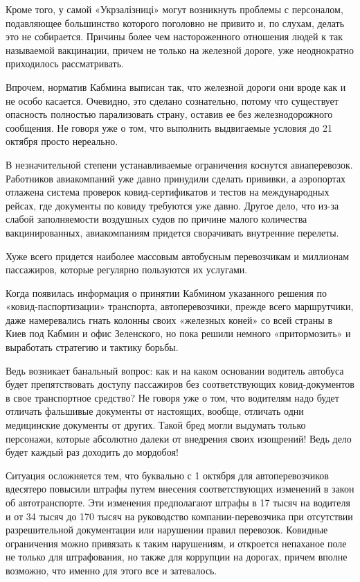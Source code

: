 Кроме того, у самой «Укрзалізниці» могут возникнуть проблемы с персоналом,
подавляющее большинство которого поголовно не привито и, по слухам, делать это
не собирается. Причины более чем настороженного отношения людей к так
называемой вакцинации, причем не только на железной дороге, уже неоднократно
приходилось рассматривать.

Впрочем, норматив Кабмина выписан так, что железной дороги они вроде как и не
особо касается. Очевидно, это сделано сознательно, потому что существует
опасность полностью парализовать страну, оставив ее без железнодорожного
сообщения. Не говоря уже о том, что выполнить выдвигаемые условия до 21 октября
просто нереально.

В незначительной степени устанавливаемые ограничения коснутся авиаперевозок.
Работников авиакомпаний уже давно принудили сделать прививки, а аэропортах
отлажена система проверок ковид-сертификатов и тестов на международных рейсах,
где документы по ковиду требуются уже давно. Другое дело, что из-за слабой
заполняемости воздушных судов по причине малого количества вакцинированных,
авиакомпаниям придется сворачивать внутренние перелеты.

Хуже всего придется наиболее массовым автобусным перевозчикам и миллионам
пассажиров, которые регулярно пользуются их услугами.

Когда появилась информация о принятии Кабмином указанного решения по
«ковид-паспортизации» транспорта, автоперевозчики, прежде всего маршрутчики,
даже намеревались гнать колонны своих «железных коней» со всей страны в Киев
под Кабмин и офис Зеленского, но пока решили немного «притормозить» и
выработать стратегию и тактику борьбы.

Ведь возникает банальный вопрос: как и на каком основании водитель автобуса
будет препятствовать доступу пассажиров без соответствующих ковид-документов в
свое транспортное средство? Не говоря уже о том, что водителям надо будет
отличать фальшивые документы от настоящих, вообще, отличать одни медицинские
документы от других. Такой бред могли выдумать только персонажи, которые
абсолютно далеки от внедрения своих изощрений! Ведь дело будет каждый раз
доходить до мордобоя!

Ситуация осложняется тем, что буквально с 1 октября для автоперевозчиков
вдесятеро повысили штрафы путем внесения соответствующих изменений в закон об
автотранспорте. Эти изменения предполагают штрафы в 17 тысяч на водителя и от
34 тысяч до 170 тысяч на руководство компании-перевозчика при отсутствии
разрешительной документации или нарушении правил перевозок. Ковидные
ограничения можно привязать к таким нарушениям, и откроется непаханое поле не
только для штрафования, но также для коррупции на дорогах, причем вполне
возможно, что именно для этого все и затевалось.

